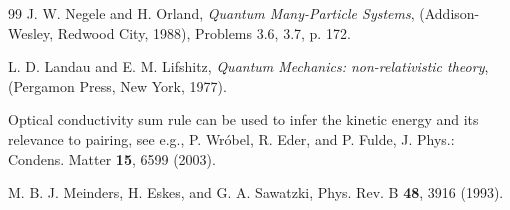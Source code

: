 \documentclass[floatfix,twocolumn,aps,prb,showpacs,superscriptaddress]{revtex4}
\begin{document}
\begin{thebibliography}{99}
 J. W. Negele and H. Orland, \textit{Quantum Many-Particle
Systems}, (Addison-Wesley, Redwood City, 1988), Problems 3.6, 3.7, p. 172.


 L. D. Landau and E. M. Lifshitz, \textit{Quantum Mechanics:
non-relativistic theory}, (Pergamon Press, New York, 1977).

 Optical conductivity sum rule can be used to infer the kinetic energy 
and its relevance to pairing, see e.g., P. Wr\'obel, R. Eder, and P. Fulde,
J. Phys.: Condens. Matter {\bf 15}, 6599 (2003).

 M. B. J. Meinders, H. Eskes, and G. A. Sawatzki, Phys.
Rev. B \textbf{48}, 3916 (1993).

\end{thebibliography}
\end{document}
